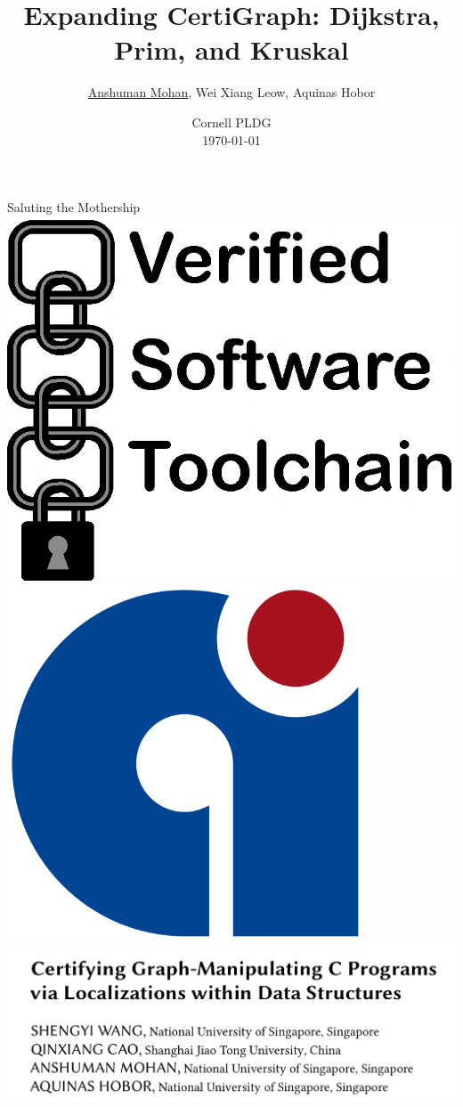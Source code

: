 \documentclass[usenames, xcolor=dvipsnames]{beamer}
\title[Expanding CertiGraph]{Expanding CertiGraph: Dijkstra, Prim, and Kruskal}
\author[Mohan, Leow, Hobor]{\underline{Anshuman Mohan}, Wei Xiang Leow, Aquinas Hobor}
\date[Cornell PLDG]{Cornell PLDG \\ \today}
\begin{document}
\begin{frame}[plain]
  \titlepage
\end{frame}

\begin{frame}{Saluting the Mothership}
\includegraphics[scale=0.09]{vst_logo}
\hspace{2em} \includegraphics[scale=0.12]{compcert_logo}
\hspace{2em} \includegraphics[scale=0.2]{paper_screen}


\end{frame}
\end{document}
